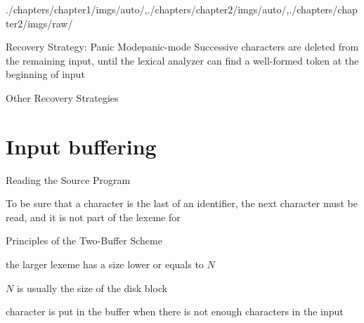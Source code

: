 \begin{graphicspathcontext}{{./chapters/chapter1/imgs/auto/},{./chapters/chapter2/imgs/auto/},{./chapters/chapter2/imgs/raw/}}
\begin{bibunit}[apalike]
\begin{leftlawnframe}{{Recovery Strategy:} Panic Mode}{panic-mode}
	Successive characters are deleted from the remaining input, until the lexical analyzer can find a well-formed token at the beginning of input
\end{leftlawnframe}

\begin{gridframe}{{Other} Recovery Strategies}
\end{gridframe}

\section{Input buffering}
\sectiontableofcontentslide

\begin{frame}{Reading the Source Program}
	\begin{leftarrowsequence}
	\end{leftarrowsequence}
	\vspace{.25cm}
	\begin{example}
		To be sure that a character is the last of an identifier, the next character must be read, and it is not part of the lexeme for 
	\end{example}
\end{frame}

\begin{frame}{Principles of the Two-Buffer Scheme}
	\begin{center}
		{}
	\end{center}
	\vspace{.25cm}
	\begin{description}
		\item[Assumption] the larger lexeme has a size lower or equals to $N$
		\item $N$ is usually the size of the disk block
		\item {} character is put in the buffer when there is not enough characters in the input
	\end{description}
	\vspace{1cm}
\end{frame}


\end{bibunit}
\end{graphicspathcontext}
